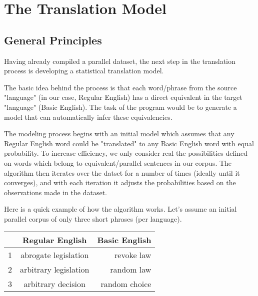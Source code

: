 \documentclass[11pt]{article}
\begin{document}
\section{The Translation Model}

\subsection{General Principles}

Having already compiled a parallel dataset, the next step in the translation process is developing a statistical translation model.

The basic idea behind the process is that each word/phrase from the source "language" (in our case, Regular English) has a direct equivalent in the target "language" (Basic English). The task of the program would be to generate a model that can automatically infer these equivalencies.

The modeling process begins with an initial model which assumes that any Regular English word could be "translated" to any Basic English word with equal probability. To increase efficiency, we only consider real the possibilities defined on words which belong to equivalent/parallel sentences in our corpus. The algorithm then iterates over the datset for a number of times (ideally until it converges), and with each iteration it adjusts the probabilities based on the observations made in the dataset.

Here is a quick example of how the algorithm works. Let's assume an initial parallel corpus of only three short phrases (per language).

\begin{center}
  \begin{tabular}{ | l | c | r |}
    \hline
	& Regular English & Basic English \\ \hline
    1 & abrogate legislation & revoke law \\ \hline
    2 & arbitrary legislation & random law \\ \hline
    3 & arbitrary decision & random choice \\
    \hline
  \end{tabular}
\end{center}
\end{document}
